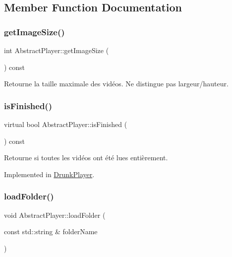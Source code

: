 \subsection{Member Function Documentation}
\mbox{\label{classAbstractPlayer_a74ade0f2da36c267661fe8e1c83f68de}} 
\subsubsection{\texorpdfstring{get\+Image\+Size()}{getImageSize()}}
{\footnotesize\ttfamily int Abstract\+Player\+::get\+Image\+Size (\begin{DoxyParamCaption}{ }\end{DoxyParamCaption}) const}

Retourne la taille maximale des vidéos. Ne distingue pas largeur/hauteur. \mbox{\label{classAbstractPlayer_a841896a599ebe6b8317905de78c44bcc}} 
\subsubsection{\texorpdfstring{is\+Finished()}{isFinished()}}
{\footnotesize\ttfamily virtual bool Abstract\+Player\+::is\+Finished (\begin{DoxyParamCaption}{ }\end{DoxyParamCaption}) const\hspace{0.3cm}{\ttfamily [pure virtual]}}



Retourne si toutes les vidéos ont été lues entièrement. 



Implemented in \hyperlink{classDrunkPlayer_a9c032dda7df01fafc757fb1f4e265bb4}{Drunk\+Player}.

\mbox{\label{classAbstractPlayer_a2091b1757bfd13116dfa4612af55473b}} 
\subsubsection{\texorpdfstring{load\+Folder()}{loadFolder()}}
{\footnotesize\ttfamily void Abstract\+Player\+::load\+Folder (\begin{DoxyParamCaption}\item[{const std\+::string \&}]{folder\+Name }\end{DoxyParamCaption})\hspace{0.3cm}{\ttfamily [virtual]}}

